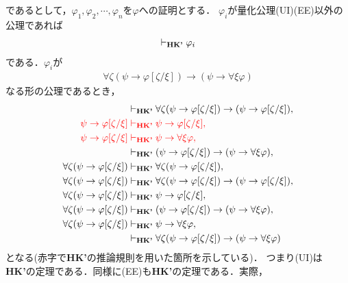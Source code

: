 	であるとして，$\varphi_{1},\varphi_{2},\cdots,\varphi_{n}$を$\varphi$への証明とする．
	$\varphi_{i}$が量化公理(UI)(EE)以外の公理であれば
	\begin{align}
		\vdash_{{\scriptsize \mbox{{\bf HK'}}}} \varphi_{i}
	\end{align}
	である．$\varphi_{i}$が
	\begin{align}
		\forall \zeta (\psi \rightarrow \varphi[\zeta/\xi]) 
		\rightarrow (\psi \rightarrow \forall \xi \varphi)
	\end{align}
	なる形の公理であるとき，
	\begin{align}
		&\vdash_{{\scriptsize \mbox{{\bf HK'}}}} 
			\forall \zeta (\psi \rightarrow \varphi[\zeta/\xi]) 
			\rightarrow (\psi \rightarrow \varphi[\zeta/\xi]), \\
		\color{red}\psi \rightarrow \varphi[\zeta/\xi] &
		\color{red}\vdash_{{\scriptsize \mbox{{\bf HK'}}}}
			\psi \rightarrow \varphi[\zeta/\xi], \\
		\color{red}\psi \rightarrow \varphi[\zeta/\xi] &
		\color{red}\vdash_{{\scriptsize \mbox{{\bf HK'}}}}
			\psi \rightarrow \forall \xi \varphi, \\
		&\vdash_{{\scriptsize \mbox{{\bf HK'}}}} (\psi \rightarrow \varphi[\zeta/\xi]) 
			\rightarrow (\psi \rightarrow \forall \xi \varphi), \\
		\forall \zeta (\psi \rightarrow \varphi[\zeta/\xi])
			&\vdash_{{\scriptsize \mbox{{\bf HK'}}}} \forall \zeta (\psi \rightarrow \varphi[\zeta/\xi]), \\
		\forall \zeta (\psi \rightarrow \varphi[\zeta/\xi])
			&\vdash_{{\scriptsize \mbox{{\bf HK'}}}} \forall \zeta (\psi \rightarrow \varphi[\zeta/\xi]) 
			\rightarrow (\psi \rightarrow \varphi[\zeta/\xi]), \\
		\forall \zeta (\psi \rightarrow \varphi[\zeta/\xi])
			&\vdash_{{\scriptsize \mbox{{\bf HK'}}}} \psi \rightarrow \varphi[\zeta/\xi], \\
		\forall \zeta (\psi \rightarrow \varphi[\zeta/\xi])
			&\vdash_{{\scriptsize \mbox{{\bf HK'}}}} (\psi \rightarrow \varphi[\zeta/\xi]) 
			\rightarrow (\psi \rightarrow \forall \xi \varphi), \\
		\forall \zeta (\psi \rightarrow \varphi[\zeta/\xi])
			&\vdash_{{\scriptsize \mbox{{\bf HK'}}}} \psi \rightarrow \forall \xi \varphi, \\
		&\vdash_{{\scriptsize \mbox{{\bf HK'}}}} \forall \zeta (\psi \rightarrow \varphi[\zeta/\xi]) 
		\rightarrow (\psi \rightarrow \forall \xi \varphi)
	\end{align}
	となる(赤字で{\bf HK'}の推論規則を用いた箇所を示している)．
	つまり(UI)は{\bf HK'}の定理である．同様に(EE)も{\bf HK'}の定理である．実際，
